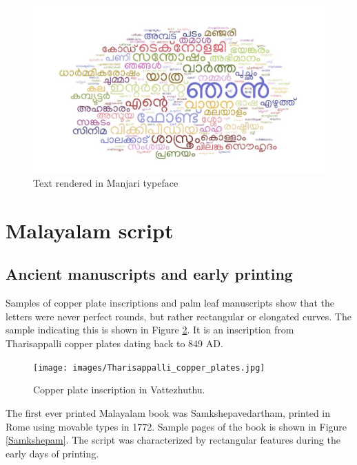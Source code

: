 \documentclass[11pt,twoside,a4paper,parskip=half]{scrartcl}
\begin{document}
\begin{figure}[h!]
	\includegraphics[width=\textwidth]{images/wordcloud.jpg}
	\caption{Text rendered in Manjari typeface}
	\label{wordcloud}
\end{figure} 

\section{Malayalam script}

\subsection{Ancient manuscripts and early printing}

Samples of copper plate inscriptions and palm leaf manuscripts show that the letters were never perfect rounds, but rather rectangular or elongated curves. The sample indicating this is shown in Figure \ref{vattezhuthu}. It is an inscription from Tharisappalli copper plates dating back to 849 AD.


\begin{figure}[h!]
	\texttt{[image: images/Tharisappalli\_copper\_plates.jpg]}
	\caption{Copper plate inscription in Vattezhuthu.}
	\label{vattezhuthu}
\end{figure} 

The first ever printed Malayalam book was Samkshepavedartham\citep{samkshepavedartham}, printed in Rome using movable types in 1772. Sample pages of the book is shown in Figure \ref{Samkshepam}. The script was characterized by rectangular features during the early days of printing. 
\end{document}
